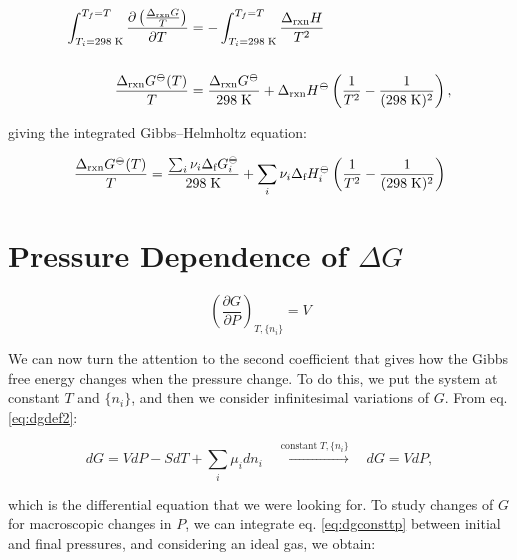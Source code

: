 \documentclass[
  9pt,
]{extbook}
\theoremstyle{definition}
\theoremstyle{definition}
\theoremstyle{definition}
\theoremstyle{remark}
\begin{document}
\begin{equation}
\begin{aligned}
\int_{T_i=298 \;\text{K}}^{T_f=T}  \frac{\partial\left( \frac{\Delta_{\text{rxn}} G}{T} \right)}{\partial T} &=  - \int_{T_i=298 \;\text{K}}^{T_f=T}  \frac{\Delta_{\text{rxn}} H}{T^2} \\ \\ \frac{\Delta_{\text{rxn}} G^{-\kern-6pt{\ominus}\kern-6pt-}(T)}{T} &=  \frac{\Delta_{\text{rxn}} G^{-\kern-6pt{\ominus}\kern-6pt-}}{298 \;\text{K}} + \Delta_{\text{rxn}} H^{-\kern-6pt{\ominus}\kern-6pt-}\left( \frac{1}{T^2} -\frac{1}{(298 \;\text{K})^2} \right),
\end{aligned}
\label{eq:gibbshelmIbase}
\end{equation}

giving the integrated Gibbs--Helmholtz equation:

\begin{equation}
\frac{\Delta_{\text{rxn}} G^{-\kern-6pt{\ominus}\kern-6pt-}(T)}{T} =  \frac{\sum_i \nu_i \Delta_{\text{f}} G_i^{-\kern-6pt{\ominus}\kern-6pt-}}{298 \;\text{K}} + \sum_i \nu_i \Delta_{\text{f}} H_i^{-\kern-6pt{\ominus}\kern-6pt-}\left( \frac{1}{T^2} -\frac{1}{(298 \;\text{K})^2} \right)
\label{eq:gibbshelmI}
\end{equation}

\hypertarget{pressure-dependence-of-delta-g}{%
\section{\texorpdfstring{Pressure Dependence of \(\Delta G\)}{Pressure Dependence of \textbackslash Delta G}}\label{pressure-dependence-of-delta-g}}

\[
\left(\frac{\partial G}{\partial P} \right)_{T,\{n_i\}}=V
\]

We can now turn the attention to the second coefficient that gives how the Gibbs free energy changes when the pressure change. To do this, we put the system at constant \(T\) and \(\{n_i\}\), and then we consider infinitesimal variations of \(G\). From eq. \eqref{eq:dgdef2}:

\begin{equation}
dG = VdP -SdT +\sum_i\mu_i dn_i \quad \xrightarrow{\text{constant}\; T,\{n_i\}} \quad dG = VdP,
\label{eq:dgconsttp}
\end{equation}

which is the differential equation that we were looking for. To study changes of \(G\) for macroscopic changes in \(P\), we can integrate eq. \eqref{eq:dgconsttp} between initial and final pressures, and considering an ideal gas, we obtain:
\end{document}
